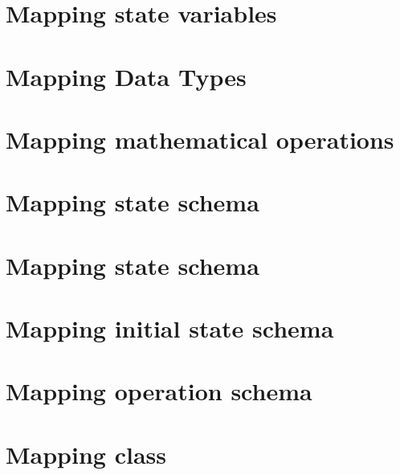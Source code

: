 \section{Mapping state variables}
\label{sec_tra_mapping_state_variables}


\section{Mapping Data Types}
\label{sec_tra_mapping_data_types}


\section{Mapping mathematical operations}
\label{sec_tra_mapping_mathematical_operations}


\section{Mapping state schema}
\label{sec_tra_mapping_state_schema}


\section{Mapping state schema}
\label{sec_tra_mapping_state_schema}


\section{Mapping initial state schema}
\label{sec_tra_mapping_initial_state_schema}


\section{Mapping operation schema}
\label{sec_tra_mapping_operation_schema}


\section{Mapping class}
\label{sec_tra_mapping_class}




